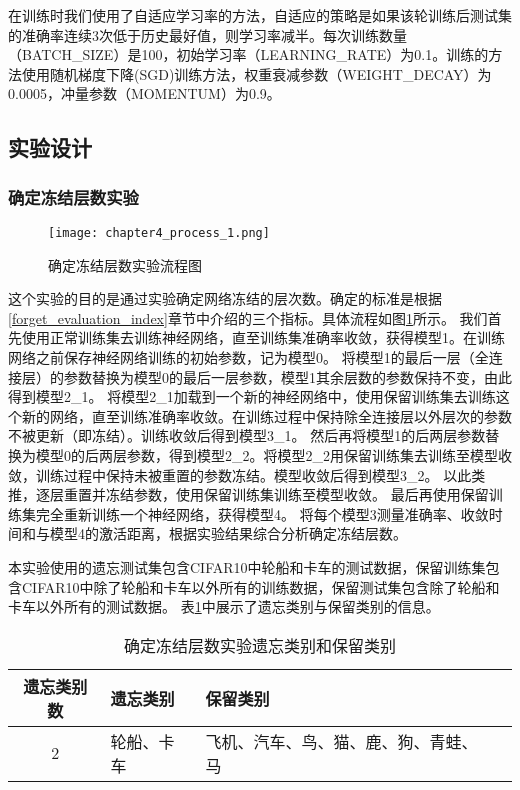 在训练时我们使用了自适应学习率的方法，自适应的策略是如果该轮训练后测试集的准确率连续3次低于历史最好值，则学习率减半。每次训练数量（BATCH\_SIZE）是100，初始学习率（LEARNING\_RATE）为0.1。训练的方法使用随机梯度下降(SGD)训练方法，权重衰减参数（WEIGHT\_DECAY）为0.0005，冲量参数（MOMENTUM）为0.9。

\subsection{实验设计}
\subsubsection{确定冻结层数实验}
\begin{figure}
    \centering
    \texttt{[image: chapter4\_process\_1.png]}
    \caption{确定冻结层数实验流程图}
    \label{fig:chapter4_process_1}
\end{figure}

这个实验的目的是通过实验确定网络冻结的层次数。确定的标准是根据\ref{forget_evaluation_index}章节中介绍的三个指标。具体流程如图\ref{fig:chapter4_process_1}所示。
我们首先使用正常训练集去训练神经网络，直至训练集准确率收敛，获得模型1。在训练网络之前保存神经网络训练的初始参数，记为模型0。
将模型1的最后一层（全连接层）的参数替换为模型0的最后一层参数，模型1其余层数的参数保持不变，由此得到模型2\_1。
将模型2\_1加载到一个新的神经网络中，使用保留训练集去训练这个新的网络，直至训练准确率收敛。在训练过程中保持除全连接层以外层次的参数不被更新（即冻结）。训练收敛后得到模型3\_1。
然后再将模型1的后两层参数替换为模型0的后两层参数，得到模型2\_2。将模型2\_2用保留训练集去训练至模型收敛，训练过程中保持未被重置的参数冻结。模型收敛后得到模型3\_2。
以此类推，逐层重置并冻结参数，使用保留训练集训练至模型收敛。
最后再使用保留训练集完全重新训练一个神经网络，获得模型4。
将每个模型3测量准确率、收敛时间和与模型4的激活距离，根据实验结果综合分析确定冻结层数。

本实验使用的遗忘测试集包含CIFAR10中轮船和卡车的测试数据，保留训练集包含CIFAR10中除了轮船和卡车以外所有的训练数据，保留测试集包含除了轮船和卡车以外所有的测试数据。
表\ref{tab:forget-continuous-2-kinds}中展示了遗忘类别与保留类别的信息。
\begin{table}
    \centering
    \caption{确定冻结层数实验遗忘类别和保留类别}
    \begin{tabular}{cp{3cm}p{3cm}p{3cm}}
      \toprule
      遗忘类别数  & 遗忘类别 & 保留类别  \\
      \midrule
      2 & 轮船、卡车  & 飞机、汽车、鸟、猫、鹿、狗、青蛙、马  \\
      \bottomrule
    \end{tabular}
    \label{tab:forget-continuous-2-kinds}
\end{table}

